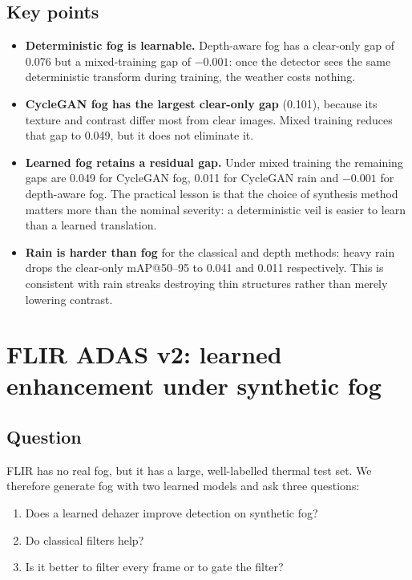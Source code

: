 \documentclass[11pt,a4paper]{article}
\begin{document}
\subsection{Key points}
\begin{itemize}[leftmargin=1.4em]
  \item \textbf{Deterministic fog is learnable.} Depth-aware fog has a
        clear-only gap of 0.076 but a mixed-training gap of $-0.001$: once the
        detector sees the same deterministic transform during training, the
        weather costs nothing.
  \item \textbf{CycleGAN fog has the largest clear-only gap} (0.101), because its
        texture and contrast differ most from clear images. Mixed training
        reduces that gap to 0.049, but it does not eliminate it.
  \item \textbf{Learned fog retains a residual gap.} Under mixed training the
        remaining gaps are 0.049 for CycleGAN fog, 0.011 for CycleGAN rain and
        $-0.001$ for depth-aware fog. The practical lesson is that the choice of
        synthesis method matters more than the nominal severity: a deterministic
        veil is easier to learn than a learned translation.
  \item \textbf{Rain is harder than fog} for the classical and depth methods:
        heavy rain drops the clear-only mAP@50--95 to 0.041 and 0.011
        respectively. This is consistent with rain streaks destroying thin
        structures rather than merely lowering contrast.
\end{itemize}

\section{FLIR ADAS v2: learned enhancement under synthetic fog}
\label{sec:flir}

\subsection{Question}
FLIR has no real fog, but it has a large, well-labelled thermal test set. We
therefore generate fog with two learned models and ask three questions:
\begin{enumerate}[leftmargin=1.4em]
  \item Does a learned dehazer improve detection on synthetic fog?
  \item Do classical filters help?
  \item Is it better to filter every frame or to gate the filter?
\end{enumerate}
\end{document}
